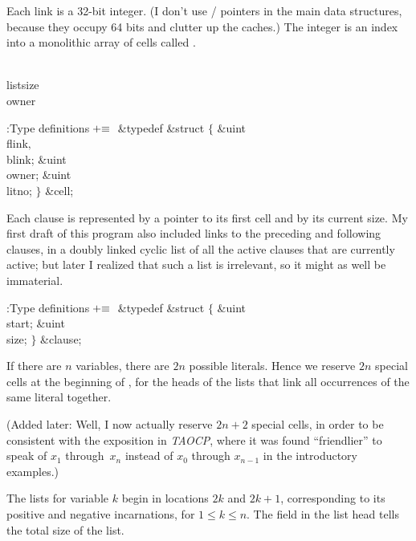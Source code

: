 Each link is a 32-bit integer. (I don't use \CEE/ pointers in the main
data structures, because they occupy 64 bits and clutter up the caches.)
The integer is an index into a monolithic array of cells called .

\Y\B\4\D\\{listsize}\5
\\{owner}\par
\Y\B\4:Type definitions\X${}\mathrel+\equiv{}$\6
\&{typedef} \&{struct} ${}\{{}$\1\6
\&{uint} \\{flink}${},{}$ \\{blink};\6
\&{uint} \\{owner};\6
\&{uint} \\{litno};\2\6
${}\}{}$ \&{cell};\par
\fi

Each clause is represented by a pointer to its first cell and by its
current size. My first draft of this program also included links to the
preceding and following clauses, in a doubly linked cyclic list
of all the active clauses that are currently active; but later I realized
that such a list is irrelevant, so it might as well be immaterial.

\Y\B\4:Type definitions\X${}\mathrel+\equiv{}$\6
\&{typedef} \&{struct} ${}\{{}$\1\6
\&{uint} \\{start};\6
\&{uint} \\{size};\2\6
${}\}{}$ \&{clause};\par
\fi

If there are $n$ variables, there are $2n$ possible literals. Hence we
reserve $2n$ special cells at the beginning of , for the heads of
the lists that link all occurrences of the same literal together.

(Added later: Well, I now actually reserve $2n+2$ special cells, in order
to be consistent with the exposition in {\sl TAOCP}, where it was found
``friendlier'' to speak of $x_1$ through~$x_n$ instead of $x_0$ through
$x_{n-1}$ in the introductory examples.)

The lists for variable $k$ begin in locations $2k$ and $2k+1$, corresponding to
its positive and negative incarnations, for $1\le k\le n$. The 
field
in the list head tells the total size of the list.

